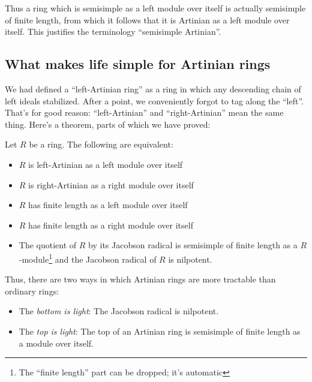 \documentclass[a4paper]{amsart}
\begin{document}
Thus a ring which is semisimple as a left module over itself is
actually semisimple of finite length, from which it follows that it is
Artinian as a left module over itself. This justifies the terminology
``semisimple Artinian''.

\subsection{What makes life simple for Artinian rings}

We had defined a ``left-Artinian ring'' as a ring in which any
descending chain of left ideals stabilized. After a point, we
conveniently forgot to tag along the ``left''. That's for good reason:
``left-Artinian'' and ``right-Artinian'' mean the same thing. Here's a
theorem, parts of which we have proved:

\begin{theorem}
  Let $R$ be a ring. The following are equivalent:

  \begin{itemize}

  \item $R$ is left-Artinian as a left module over itself

  \item $R$ is right-Artinian as a right module over itself

  \item $R$ has finite length as a left module over itself

  \item $R$ has finite length as a right module over itself

  \item The quotient of $R$ by its Jacobson radical is semisimple of
    finite length as a $R$-module\footnote{The ``finite length'' part
      can be dropped; it's automatic} and the Jacobson radical of $R$
    is nilpotent.

  \end{itemize}
\end{theorem}

Thus, there are two ways in which Artinian rings are more tractable than
ordinary rings:

\begin{itemize}

\item The {\em bottom is light}: The Jacobson radical is nilpotent.

\item The {\em top is light}: The top of an Artinian ring is
  semisimple of finite length as a module over itself.

\end{itemize}
\end{document}
